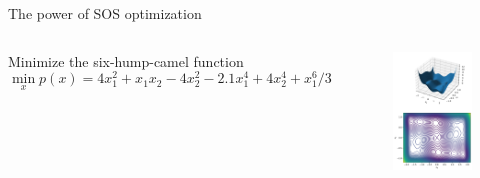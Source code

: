 \documentclass[aspectratio=169]{beamer}
\begin{document}
\begin{frame}{The power of SOS optimization \href{https://colab.research.google.com/github/TobiaMarcucci/optimal_control_pisa/blob/master/demos/six_hump_camel.ipynb}{}}
\begin{columns}
Minimize the six-hump-camel function
$$
\min_x p(x) = 4 x_1^2 + x_1 x_2 - 4 x_2^2 - 2.1 x_1^4 + 4 x_2^4 + x_1^6 / 3
$$
\vspace{-5mm}
\begin{figure}
\includegraphics[width=\columnwidth]{figures/camel.pdf}
\end{figure}
\end{columns}
\end{frame}
\end{document}
